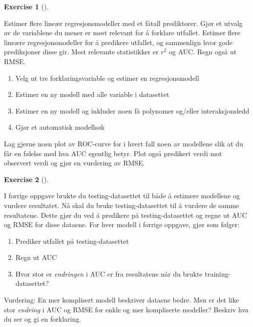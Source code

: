 \documentclass[
  letterpaper,
  DIV=11,
  numbers=noendperiod]{scrreprt}
\providecommand{\tightlist}{%
  \setlength{\itemsep}{0pt}\setlength{\parskip}{0pt}}\usepackage{longtable,booktabs,array}
\theoremstyle{definition}
\newtheorem{exercise}{Exercise}[chapter]
\theoremstyle{remark}
\begin{document}
\leavevmode{}%
\begin{exercise}[]\label{exr-logit-train}

Estimer flere lineær regresjonsmodeller med et fåtall prediktorer. Gjør
et utvalg av de variablene du mener er mest relevant for å forklare
utfallet. Estimer flere lineære regresjonsmodeller for å predikere
utfallet, og sammenlign hvor gode prediksjoner disse gir. Mest relevante
statistikker er \(r^2\) og AUC. Regn også ut RMSE.

\begin{enumerate}
\def\labelenumi{\alph{enumi})}
\tightlist
\item
  Velg ut tre forklaringsvariable og estimer en regresjonsmodell
\item
  Estimer en ny modell med alle variable i datasettet
\item
  Estimer en ny modell og inkluder noen få polynomer og/eller
  interaksjonsledd
\item
  Gjør et automatisk modellsøk
\end{enumerate}

Lag gjerne noen plot av ROC-curve for i hvert fall noen av modellene
slik at du får en følelse med hva AUC egentlig betyr. Plot også
predikert verdi mot observert verdi og gjør en vurdering av RMSE.

\end{exercise}

\leavevmode{}%
\begin{exercise}[]\label{exr-logit-test}

I forrige oppgave brukte du testing-datasettet til både å estimere
modellene og vurdere resultatet. Nå skal du bruke testing-datasettet til
å vurdere de samme resultatene. Dette gjør du ved å predikere på
testing-datasettet og regne ut AUC og RMSE for disse dataene. For hver
modell i forrige oppgave, gjør som følger:

\begin{enumerate}
\def\labelenumi{\alph{enumi})}
\tightlist
\item
  Prediker utfallet på testing-datasettet
\item
  Regn ut AUC
\item
  Hvor stor er \emph{endringen} i AUC er fra resultatene når du brukte
  training-datasettet?
\end{enumerate}

Vurdering: En mer komplisert modell beskriver dataene bedre. Men er det
like stor \emph{endring} i AUC og RMSE for enkle og mer kompliserte
modeller? Beskriv hva du ser og gi en forklaring.

\end{exercise}
\end{document}
